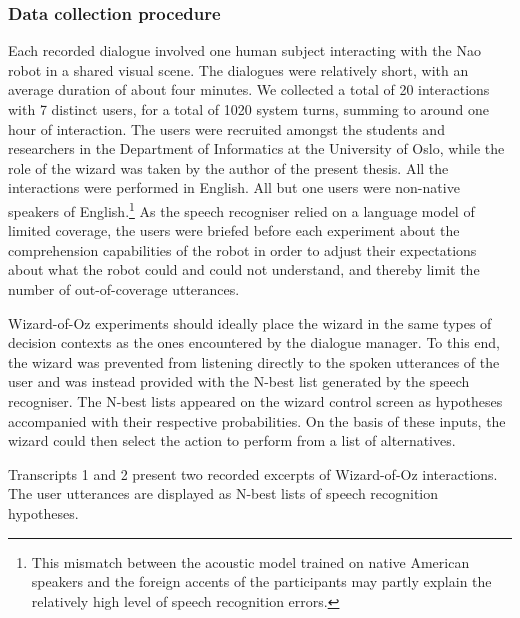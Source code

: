\subsubsection*{Data collection procedure}

 Each recorded dialogue involved one human subject interacting with the Nao robot in a shared visual scene.  The dialogues were relatively short, with an average duration of about four minutes. We collected a total of 20 interactions with 7 distinct users, for a total of 1020 system turns, summing to around one hour of interaction.  The users were recruited amongst the students and researchers in the Department of Informatics at the University of Oslo, while the role of the wizard was taken by the author of the present thesis.  All the interactions were performed in English. All but one users were non-native speakers of English.\footnote{This mismatch between the acoustic model trained on native American speakers and the foreign accents of the participants may partly explain the relatively high level of speech recognition errors.}  As the speech recogniser relied on a language model of limited coverage, the users were briefed before each experiment about the comprehension capabilities of the robot in order to adjust their expectations about what the robot could and could not understand, and thereby limit the number of out-of-coverage utterances.

Wizard-of-Oz experiments should ideally place the wizard in the same types of decision contexts as the ones encountered by the dialogue manager. To this end, the wizard was prevented from listening directly to the spoken utterances of the user and was instead provided with the N-best list generated by the speech recogniser.  The N-best lists appeared on the wizard control screen as hypotheses accompanied with their respective probabilities. On the basis of these inputs, the wizard could then select the action to perform from a list of alternatives.  

Transcripts 1 and 2 present two recorded excerpts of Wizard-of-Oz interactions.  The user utterances are displayed as N-best lists of speech recognition hypotheses. 

